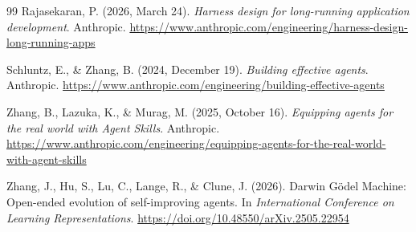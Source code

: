 \documentclass[11pt,a4paper]{article}
\begin{document}
\begin{thebibliography}{99}
Rajasekaran, P. (2026, March 24). \emph{Harness design for long-running application development}. Anthropic. \url{https://www.anthropic.com/engineering/harness-design-long-running-apps}

Schluntz, E., \& Zhang, B. (2024, December 19). \emph{Building effective agents}. Anthropic. \url{https://www.anthropic.com/engineering/building-effective-agents}

Zhang, B., Lazuka, K., \& Murag, M. (2025, October 16). \emph{Equipping agents for the real world with Agent Skills}. Anthropic. \url{https://www.anthropic.com/engineering/equipping-agents-for-the-real-world-with-agent-skills}

Zhang, J., Hu, S., Lu, C., Lange, R., \& Clune, J. (2026). Darwin G\"odel Machine: Open-ended evolution of self-improving agents. In \emph{International Conference on Learning Representations}. \url{https://doi.org/10.48550/arXiv.2505.22954}

\end{thebibliography}
\end{document}
